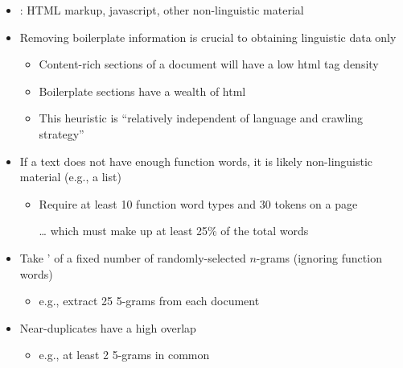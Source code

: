 \documentclass[a4paper,landscape,headrule,footrule,dvips]{foils}
\begin{document}
\begin{CJK}{UTF8}{min}
\begin{itemize}
\item {}: HTML markup, javascript, other non-linguistic
  material
\item Removing boilerplate information is crucial to obtaining
  linguistic data only
  \begin{itemize}
  \item Content-rich sections of a document will have a low 
    html tag density
  \item Boilerplate sections have a wealth of html
  \item This heuristic is ``relatively independent of language and
    crawling strategy''
  \end{itemize}
\item If a text does not have enough function words, it is likely
non-linguistic material (e.g., a list)
\begin{itemize}
\item Require at least 10 function word types and 30 tokens on a page
\item[\ldots]  which must make up at least 25\% of the total
words
\end{itemize}
\end{itemize}

\begin{itemize}
\item Take ' of a fixed number of randomly-selected $n$-grams (ignoring function words)
  \begin{itemize}
  \item e.g., extract 25 5-grams from each document
  \end{itemize}
\item Near-duplicates have a high overlap
 \begin{itemize}
 \item e.g., at least 2 5-grams in common
 \end{itemize}
\end{itemize}





\end{CJK}
\end{document}

